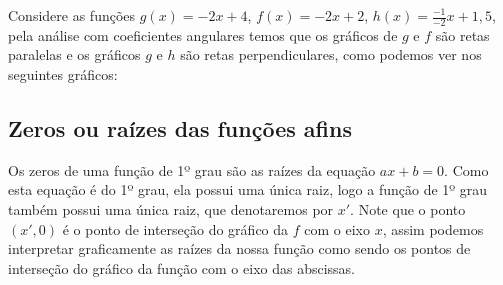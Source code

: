   \begin{exem}
  Considere as funções $g(x)= -2x+4$, $f(x)= -2x+2$, $h(x)= \frac{-1}{-2}x+ 1,5$, pela análise com coeficientes angulares temos que os gráficos de $g$ e $f$ são retas paralelas e os gráficos $g$ e $h$ são retas perpendiculares, como podemos ver nos seguintes gráficos:
     \begin{figure}[H]
  \end{figure}
  \end{exem}


 \subsection{Zeros ou raízes das funções afins}


 Os zeros de uma função de 1º grau são as raízes da equação $ax+b=0$. Como esta equação é do 1º grau, ela possui uma única raiz, logo a função de 1º grau também possui uma única raiz, que denotaremos por $x'$. Note que o ponto $(x', 0)$ é o ponto de interseção do gráfico da $f$ com o eixo $x$, assim podemos interpretar graficamente as raízes da nossa função como sendo os pontos de interseção do gráfico da função com o eixo das abscissas.

